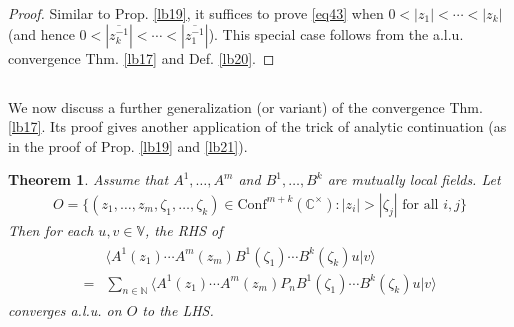 \documentclass[12pt,b5paper,notitlepage]{article}
\theoremstyle{definition}
\theoremstyle{plain}
\newtheorem{thm}[df]{Theorem}
\newcommand{\ovl}{\overline}
\newcommand{\Conf}{\mathrm{Conf}}
\newcommand{\bk}[1]{\langle {#1}\rangle}
\newcommand{\Vbb}{\mathbb V}
\newcommand{\Cbb}{\mathbb C}
\newcommand{\Nbb}{\mathbb N}
\numberwithin{equation}{section}
\begin{document}
\begin{proof}
Similar to Prop. \ref{lb19}, it suffices to prove \eqref{eq43} when $0<|z_1|<\cdots<|z_k|$ (and hence $0<|\ovl{z_k^{-1}}|<\cdots<|\ovl{z_1^{-1}}|$). This special case follows from the a.l.u. convergence Thm. \ref{lb17} and Def. \ref{lb20}.
\end{proof}









\subsection{}


We now discuss a further generalization (or variant) of the convergence Thm. \ref{lb17}. Its proof gives another application of the trick of analytic continuation (as in the proof of Prop. \ref{lb19} and \ref{lb21}).

\begin{thm}\label{lb22}
Assume that $A^1,\dots,A^m$ and $B^1,\dots,B^k$ are mutually local fields. Let
\begin{align*}
O=\{(z_1,\dots,z_m,\zeta_1,\dots,\zeta_k)\in\Conf^{m+k}(\Cbb^{\times}):|z_i|>|\zeta_j|\text{ for all }i,j\}
\end{align*}
Then for each $u,v\in\Vbb$, the RHS of 
\begin{align}
\begin{aligned}
&\bk{A^1(z_1)\cdots A^m(z_m)B^1(\zeta_1)\cdots B^k(\zeta_k)u|v}\\
=&\sum_{n\in\Nbb}\bk{A^1(z_1)\cdots A^m(z_m)P_nB^1(\zeta_1)\cdots B^k(\zeta_k)u|v}
\end{aligned}
\end{align}
converges a.l.u. on $O$ to the LHS.
\end{thm}
\end{document}
